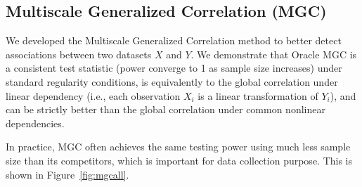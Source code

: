 \documentclass[simplex.tex]{subfiles}
\begin{document}
\subsection{Multiscale Generalized Correlation (MGC)}

We developed the Multiscale Generalized Correlation method to better detect associations between two datasets $X$ and $Y$. We demonstrate that Oracle MGC is a consistent test statistic (power converge to 1 as sample size increases) under standard regularity conditions, is equivalently to the global correlation under linear dependency (i.e., each observation $X_i$ is a linear transformation of $Y_i$), and can be strictly better than the global correlation under common nonlinear dependencies. 

In practice, MGC often achieves the same testing power using much less sample size than its competitors, which is important for data collection purpose. This is shown in Figure~\ref{fig:mgcall}.
%
\end{document}
